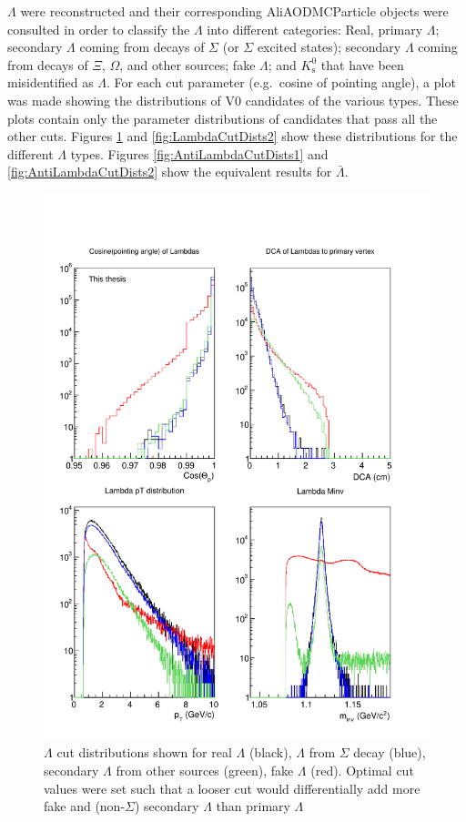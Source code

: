 $\Lambda$ were reconstructed and their corresponding AliAODMCParticle objects were consulted in order to classify the $\Lambda$ into different categories: Real, primary $\Lambda$; secondary $\Lambda$ coming from decays of $\Sigma$ (or $\Sigma$ excited states); secondary $\Lambda$ coming from decays of $\Xi$, $\Omega$, and other sources; fake $\Lambda$; and $K^0_\mathrm{s}$ that have been misidentified as $\Lambda$.  
For each cut parameter (e.g.\ cosine of pointing angle), a plot was made showing the distributions of V0 candidates of the various types.  
These plots contain only the parameter distributions of candidates that pass all the other cuts.  Figures \ref{fig:LambdaCutDists1} and \ref{fig:LambdaCutDists2} show these distributions for the different $\Lambda$ types.  
Figures \ref{fig:AntiLambdaCutDists1} and \ref{fig:AntiLambdaCutDists2} show the equivalent results for $\bar{\Lambda}$.

\begin{figure}
\includegraphics[width=36pc]{Figures/2014-03-31-Distribution-Lambda-4Types-CosP-DCA-pT-Minv.pdf}
\caption[$\Lambda$ cut distributions]{$\Lambda$ cut distributions shown for real $\Lambda$ (black), $\Lambda$ from $\Sigma$ decay (blue), secondary $\Lambda$ from other sources (green), fake $\Lambda$ (red). 
Optimal cut values were set such that a looser cut would differentially add more fake and (non-$\Sigma$) secondary $\Lambda$ than primary $\Lambda$}
\label{fig:LambdaCutDists1}
\end{figure}

